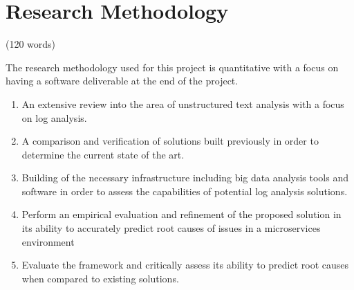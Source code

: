 \chapter{Research Methodology}

(120 words)

The research methodology used for this project is quantitative with a focus on having a software deliverable at the end of the project.

\begin{enumerate}
    \item An extensive review into the area of unstructured text analysis with a focus on log analysis.
    \item A comparison and verification of solutions built previously in order to determine the current state of the art.
    \item Building of the necessary infrastructure including big data analysis tools and software in order to assess the capabilities of potential log analysis solutions.
    \item Perform an empirical evaluation and refinement of the proposed solution in its ability to accurately predict root causes of issues in a microservices environment
    \item Evaluate the framework and critically assess its ability to predict root causes when compared to existing solutions.
\end{enumerate}